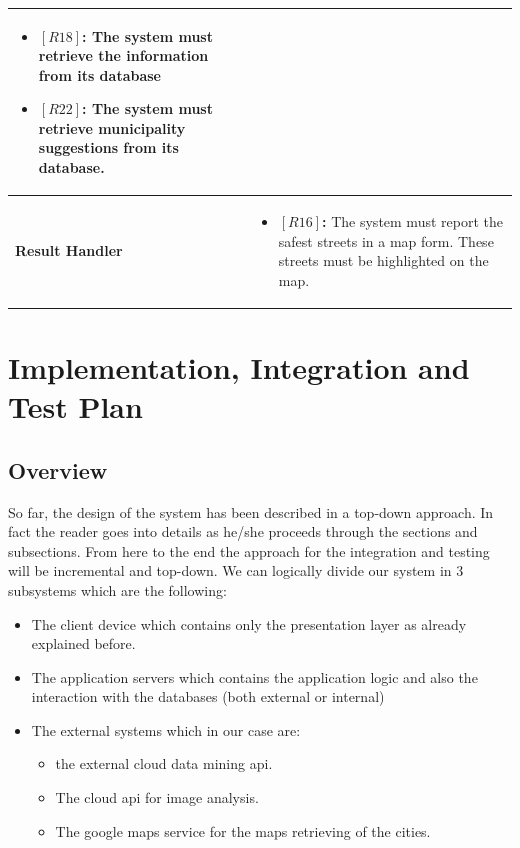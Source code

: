 \documentclass[titlepage]{article}
\begin{document}
\begin{longtable}{| p{7 cm} | p{8 cm} |}
\begin{itemize}
			\item \textbf{$[R18]$:} The system must retrieve the information from its database
			\item \textbf{$[R22]$:} The system must retrieve municipality suggestions from its database. 
		\end{itemize} \\ \hline
		\newline \textbf {Result Handler} &
		\begin{itemize}
			\item \textbf{$[R16]$:} The system must report the safest streets in a map form. These streets must be highlighted on the map. 
		\end{itemize} \\ \hline
\end{longtable}

\section{Implementation, Integration and Test Plan}
\subsection{Overview}
So far, the design of the system has been described in a top-down approach. In fact the reader goes into details as he/she proceeds through the sections and subsections. From here to the end the approach for the integration and testing will be incremental and top-down. We can logically divide our system in 3 subsystems which are the following:

\begin{itemize}
	\item The client device which contains only the presentation layer as already explained before.
	\item The application servers which contains the application logic and also the interaction with the databases (both external or internal)
	\item The external systems which in our case are:
	\begin{itemize}
		\item the external  cloud data mining api.
		\item The cloud api for image analysis.
		\item The google maps service for the maps retrieving of the cities.
	\end{itemize}
\end{itemize} 
\end{document}
